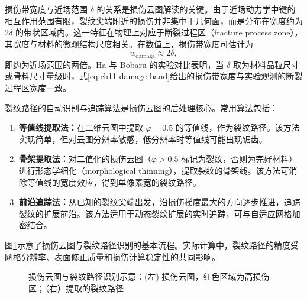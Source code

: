损伤带宽度与近场范围 $\delta$ 的关系是损伤云图解读的关键。由于近场动力学中键的相互作用范围有限，裂纹尖端附近的损伤并非集中于几何面，而是分布在宽度约为 $2\delta$ 的带状区域内。这一特征在物理上对应于断裂过程区（fracture process zone），其宽度与材料的微观结构尺度相关。在数值上，损伤带宽度可估计为
\begin{equation}
w_{\mathrm{damage}}\approx 2\delta,
\label{eq:ch11-damage-band}
\end{equation}
即约为近场范围的两倍。Ha 与 Bobaru \cite{HaBobaru2011} 的实验对比表明，当 $\delta$ 取为材料晶粒尺寸或骨料尺寸量级时，式\eqref{eq:ch11-damage-band}给出的损伤带宽度与实验观测的断裂过程区宽度一致。

裂纹路径的自动识别与追踪算法是损伤云图的后处理核心。常用算法包括：
\begin{enumerate}
\item \textbf{等值线提取法：}在二维云图中提取 $\varphi=0.5$ 的等值线，作为裂纹路径。该方法实现简单，但对云图分辨率敏感，低分辨率时等值线可能出现锯齿。
\item \textbf{骨架提取法：}对二值化的损伤云图（$\varphi>0.5$ 标记为裂纹，否则为完好材料）进行形态学细化（morphological thinning），提取裂纹的骨架线。该方法可消除等值线的宽度效应，得到单像素宽的裂纹路径。
\item \textbf{前沿追踪法：}从已知的裂纹尖端出发，沿损伤梯度最大的方向逐步推进，追踪裂纹的扩展前沿。该方法适用于动态裂纹扩展的实时追踪，可与自适应网格加密结合。
\end{enumerate}

图\ref{fig:ch11-damage-cloud}示意了损伤云图与裂纹路径识别的基本流程。实际计算中，裂纹路径的精度受网格分辨率、表面修正质量和损伤计算稳定性的共同影响。

\begin{figure}[htbp]
  \centering
  \caption{损伤云图与裂纹路径识别示意：(左) 损伤云图，红色区域为高损伤区；（右）提取的裂纹路径}
  \label{fig:ch11-damage-cloud}
\end{figure}

